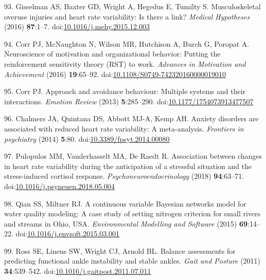 \documentclass[
  english,
  man]{apa6}
\newenvironment{cslreferences}%
  {}%
  {\par}
\begin{document}
\begin{cslreferences}
\leavevmode\hypertarget{ref-Gisselman2016}{}%
93. Gisselman AS, Baxter GD, Wright A, Hegedus E, Tumilty S. Musculoskeletal overuse injuries and heart rate variability: Is there a link? \emph{Medical Hypotheses} (2016) \textbf{87}:1--7. doi:\href{https://doi.org/10.1016/j.mehy.2015.12.003}{10.1016/j.mehy.2015.12.003}

\leavevmode\hypertarget{ref-Corr2016b}{}%
94. Corr PJ, McNaughton N, Wilson MR, Hutchison A, Burch G, Poropat A. Neuroscience of motivation and organizational behavior: Putting the reinforcement sensitivity theory (RST) to work. \emph{Advances in Motivation and Achievement} (2016) \textbf{19}:65--92. doi:\href{https://doi.org/10.1108/S0749-742320160000019010}{10.1108/S0749-742320160000019010}

\leavevmode\hypertarget{ref-Corr2013}{}%
95. Corr PJ. Approach and avoidance behaviour: Multiple systems and their interactions. \emph{Emotion Review} (2013) \textbf{5}:285--290. doi:\href{https://doi.org/10.1177/1754073913477507}{10.1177/1754073913477507}

\leavevmode\hypertarget{ref-Chalmers2014}{}%
96. Chalmers JA, Quintana DS, Abbott MJ-A, Kemp AH. Anxiety disorders are associated with reduced heart rate variability: A meta-analysis. \emph{Frontiers in psychiatry} (2014) \textbf{5}:80. doi:\href{https://doi.org/10.3389/fpsyt.2014.00080}{10.3389/fpsyt.2014.00080}

\leavevmode\hypertarget{ref-Pulopulos2018}{}%
97. Pulopulos MM, Vanderhasselt MA, De Raedt R. Association between changes in heart rate variability during the anticipation of a stressful situation and the stress-induced cortisol response. \emph{Psychoneuroendocrinology} (2018) \textbf{94}:63--71. doi:\href{https://doi.org/10.1016/j.psyneuen.2018.05.004}{10.1016/j.psyneuen.2018.05.004}

\leavevmode\hypertarget{ref-Qian2015}{}%
98. Qian SS, Miltner RJ. A continuous variable Bayesian networks model for water quality modeling: A case study of setting nitrogen criterion for small rivers and streams in Ohio, USA. \emph{Environmental Modelling and Software} (2015) \textbf{69}:14--22. doi:\href{https://doi.org/10.1016/j.envsoft.2015.03.001}{10.1016/j.envsoft.2015.03.001}

\leavevmode\hypertarget{ref-Ross2011}{}%
99. Ross SE, Linens SW, Wright CJ, Arnold BL. Balance assessments for predicting functional ankle instability and stable ankles. \emph{Gait and Posture} (2011) \textbf{34}:539--542. doi:\href{https://doi.org/10.1016/j.gaitpost.2011.07.011}{10.1016/j.gaitpost.2011.07.011}
\end{cslreferences}

\endgroup
\end{document}
